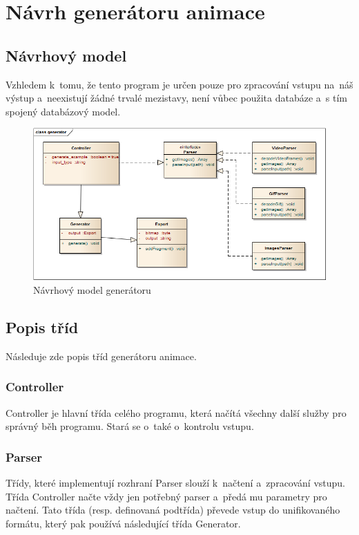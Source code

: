 \chapter{Návrh generátoru animace}

\section{Návrhový model}

Vzhledem k~tomu, že tento program je určen pouze pro zpracování vstupu na~náš výstup a~neexistují žádné trvalé mezistavy, není vůbec použita databáze a~s tím spojený databázový model.

\begin{figure}[h]
\centering
\includegraphics[width=1\textwidth]{figures/generator.png}
\caption{Návrhový model generátoru}
\label{fig:generator}
\end{figure}

\section{Popis tříd}

Následuje zde popis tříd generátoru animace. 

\subsection{Controller}
Controller je hlavní třída celého programu, která načítá všechny další služby pro správný běh programu. Stará se o~také o~kontrolu vstupu.

\subsection{Parser}
\label{secition:generatorparserclass}

Třídy, které implementují rozhraní Parser slouží k~načtení a~zpracování vstupu. Třída Controller načte vždy jen potřebný parser a~předá mu parametry pro načtení. Tato třída (resp. definovaná podtřída) převede vstup do unifikovaného formátu, který pak používá následující třída Generator. 

